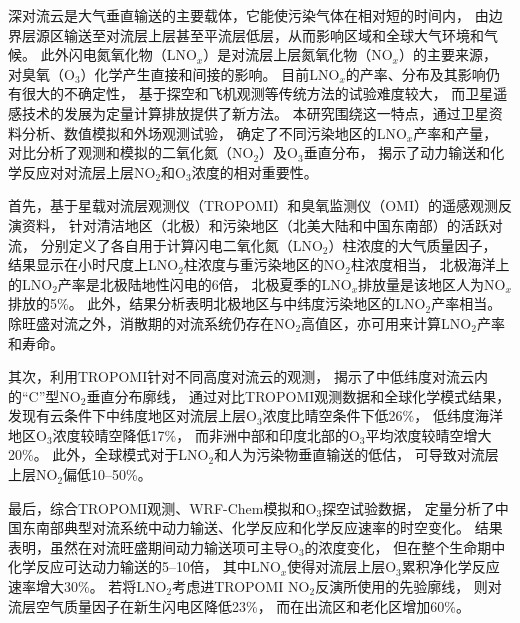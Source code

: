 
\abstract
{
深对流云是大气垂直输送的主要载体，它能使污染气体在相对短的时间内，
由边界层源区输送至对流层上层甚至平流层低层，从而影响区域和全球大气环境和气候。
此外闪电氮氧化物（LNO$_x$）是对流层上层氮氧化物（NO$_x$）的主要来源，
对臭氧（O$_3$）化学产生直接和间接的影响。
目前LNO$_x$的产率、分布及其影响仍有很大的不确定性，
基于探空和飞机观测等传统方法的试验难度较大，
而卫星遥感技术的发展为定量计算排放提供了新方法。
本研究围绕这一特点，通过卫星资料分析、数值模拟和外场观测试验，
确定了不同污染地区的LNO$_x$产率和产量，
对比分析了观测和模拟的二氧化氮（NO$_2$）及O$_3$垂直分布，
揭示了动力输送和化学反应对对流层上层NO$_2$和O$_3$浓度的相对重要性。

首先，基于星载对流层观测仪（TROPOMI）和臭氧监测仪（OMI）的遥感观测反演资料，
针对清洁地区（北极）和污染地区（北美大陆和中国东南部）的活跃对流，
分别定义了各自用于计算闪电二氧化氮（LNO$_2$）柱浓度的大气质量因子，
结果显示在小时尺度上LNO$_2$柱浓度与重污染地区的NO$_2$柱浓度相当，
北极海洋上的LNO$_2$产率是北极陆地性闪电的6倍，
北极夏季的LNO$_x$排放量是该地区人为NO$_x$排放的5\%。
此外，结果分析表明北极地区与中纬度污染地区的LNO$_2$产率相当。
除旺盛对流之外，消散期的对流系统仍存在NO$_2$高值区，亦可用来计算LNO$_2$产率和寿命。

其次，利用TROPOMI针对不同高度对流云的观测，
揭示了中低纬度对流云内的“C”型NO$_2$垂直分布廓线，
通过对比TROPOMI观测数据和全球化学模式结果，
发现有云条件下中纬度地区对流层上层O$_3$浓度比晴空条件下低26\%，
低纬度海洋地区O$_3$浓度较晴空降低17\%，
而非洲中部和印度北部的O$_3$平均浓度较晴空增大20\%。
此外，全球模式对于LNO$_2$和人为污染物垂直输送的低估，
可导致对流层上层NO$_2$偏低10--50\%。

最后，综合TROPOMI观测、WRF-Chem模拟和O$_3$探空试验数据，
定量分析了中国东南部典型对流系统中动力输送、化学反应和化学反应速率的时空变化。
结果表明，虽然在对流旺盛期间动力输送项可主导O$_3$的浓度变化，
但在整个生命期中化学反应可达动力输送的5--10倍，
其中LNO$_x$使得对流层上层O$_3$累积净化学反应速率增大30\%。
若将LNO$_2$考虑进TROPOMI NO$_2$反演所使用的先验廓线，
则对流层空气质量因子在新生闪电区降低23\%，
而在出流区和老化区增加60\%。
}
